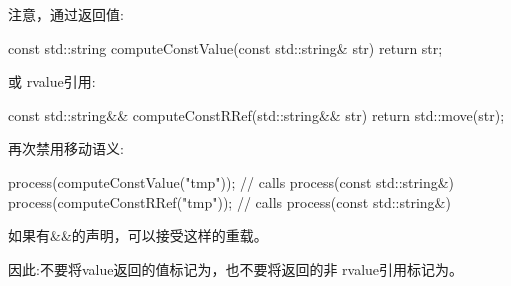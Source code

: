 注意，通过返回值:

\begin{cppcode}
const std::string computeConstValue(const std::string& str) {
	return str;
}
\end{cppcode}

或 rvalue引用:

\begin{cppcode}
const std::string&& computeConstRRef(std::string&& str) {
	return std::move(str);
}
\end{cppcode}

再次禁用移动语义:

\begin{cppcode}
process(computeConstValue("tmp")); // calls process(const std::string&)
process(computeConstRRef("tmp")); // calls process(const std::string&)
\end{cppcode}

如果有\&\&的声明，可以接受这样的重载。

因此:不要将value返回的值标记为，也不要将返回的非 rvalue引用标记为。


